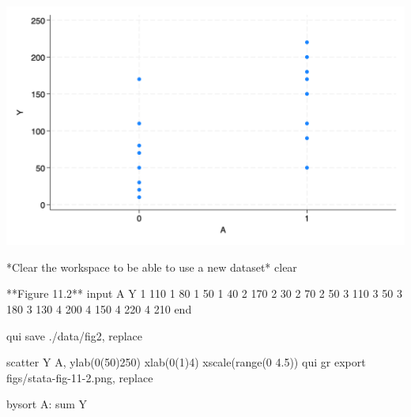 \documentclass[
  10pt,
  a4paper,
]{book}
\newenvironment{Shaded}{\begin{snugshade}}{\end{snugshade}}
\newcommand{\BaseNTok}[1]{\textcolor[rgb]{0.68,0.00,0.00}{#1}}
\newcommand{\KeywordTok}[1]{\textcolor[rgb]{0.00,0.46,0.62}{#1}}
\newcommand{\NormalTok}[1]{\textcolor[rgb]{0.00,0.46,0.62}{#1}}
\begin{document}
\begin{center}\includegraphics[width=0.85\linewidth]{figs/stata-fig-11-1} \end{center}

\begin{Shaded}
\begin{Highlighting}[]
\NormalTok{*Clear the workspace to }\KeywordTok{be}\NormalTok{ able to }\KeywordTok{use}\NormalTok{ a }\KeywordTok{new}\NormalTok{ dataset*}
\KeywordTok{clear}

\NormalTok{**Figure 11.2**}
\NormalTok{input A Y}
\NormalTok{1 110}
\NormalTok{1 80}
\NormalTok{1 50}
\NormalTok{1 40}
\NormalTok{2 170}
\NormalTok{2 30}
\NormalTok{2 70}
\NormalTok{2 50}
\NormalTok{3 110}
\NormalTok{3 50}
\NormalTok{3 180}
\NormalTok{3 130}
\NormalTok{4 200}
\NormalTok{4 150}
\NormalTok{4 220}
\NormalTok{4 210}
\KeywordTok{end}

\KeywordTok{qui} \KeywordTok{save}\NormalTok{ ./}\KeywordTok{data}\NormalTok{/fig2, }\KeywordTok{replace}

\KeywordTok{scatter}\NormalTok{ Y A, ylab(0(50)250) xlab(0(1)4) }\BaseNTok{xscale}\NormalTok{(}\KeywordTok{range}\NormalTok{(0 4.5))}
\KeywordTok{qui} \KeywordTok{gr} \KeywordTok{export}\NormalTok{ figs/stata{-}fig{-}11{-}2.png, }\KeywordTok{replace}

\KeywordTok{bysort}\NormalTok{ A: }\KeywordTok{sum}\NormalTok{ Y}
\end{Highlighting}
\end{Shaded}
\end{document}
